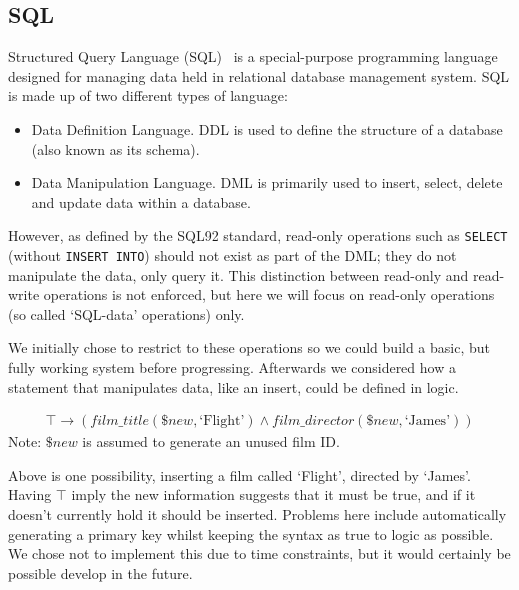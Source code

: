 \documentclass[a4paper, 11pt]{article}
\begin{document}
  \subsection{SQL}
    Structured Query Language (SQL)~\cite{wiki:SQL} is a special-purpose
    programming language designed for managing data held in relational database
    management system. SQL is made up of two different types of language:

    \begin{itemize}
      \item
        Data Definition Language. DDL is used to define the structure of a
        database (also known as its schema).
      \item
        Data Manipulation Language. DML is primarily used to insert, select,
        delete and update data within a database.
    \end{itemize}

    However, as defined by the SQL92 standard\cite{isoSQL}, read-only operations
    such as \texttt{SELECT} (without \texttt{INSERT INTO}) should not exist as
    part of the DML; they do not manipulate the data, only query it. This
    distinction between read-only and read-write operations is not enforced, but
    here we will focus on read-only operations (so called `SQL-data' operations)
    only.

    We initially chose to restrict to these operations so we could build a basic,
    but fully working system before progressing. Afterwards we considered how
    a statement that manipulates data, like an insert, could be defined in logic.
    \begin{center}
      \begin{gather}
        \top \rightarrow (film\_title(\$new, \text{`Flight'}) \land
          film\_director(\$new, \text{`James'}))
      \end{gather}
      Note: $\$new$ is assumed to generate an unused film ID.
    \end{center}

    Above is one possibility, inserting a film called `Flight', directed by
    `James'. Having $\top$ imply the new information suggests that it must be
    true, and if it doesn't currently hold it should be inserted. Problems here
    include automatically generating a primary key whilst keeping the syntax as
    true to logic as possible. We chose not to implement this due to time
    constraints, but it would certainly be possible develop in the future.
\end{document}
